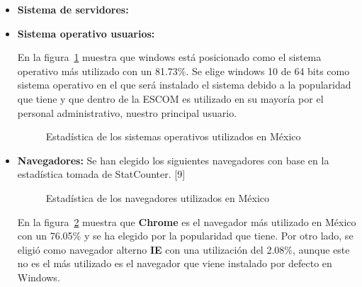 \begin{itemize}
	\item \textbf{Sistema de servidores:}
	
	\item \textbf{Sistema operativo usuarios:} 
	
	En la figura~\ref{fig:so} muestra que windows está posicionado como el sistema operativo más utilizado con un 81.73\%. Se elige windows 10 de 64 bits como sistema operativo en el que será instalado el sistema debido a la popularidad que tiene y que dentro de la ESCOM es utilizado en su mayoría por el personal administrativo, nuestro principal usuario.
	
	\begin{figure}[htbp!]
		\begin{center}
			\caption{Estadística de los sistemas operativos utilizados en México}
			\label{fig:so}
		\end{center}
	\end{figure}
	
	\item \textbf{Navegadores:} Se han elegido los siguientes navegadores con base en la estadística tomada de StatCounter. [9] 
	
	\begin{figure}[htbp!]
		\begin{center}
			\caption{Estadística de los navegadores utilizados en México}
			\label{fig:navegadores}
		\end{center}
	\end{figure}
	
	En la figura~\ref{fig:navegadores} muestra que \textbf{Chrome} es el navegador más utilizado en México con un 76.05\% y se ha elegido por la popularidad que tiene. Por otro lado, se eligió como navegador alterno \textbf{IE} con una utilización del 2.08\%, aunque este no es el más utilizado es el navegador que viene instalado por defecto en Windows.
\end{itemize}

